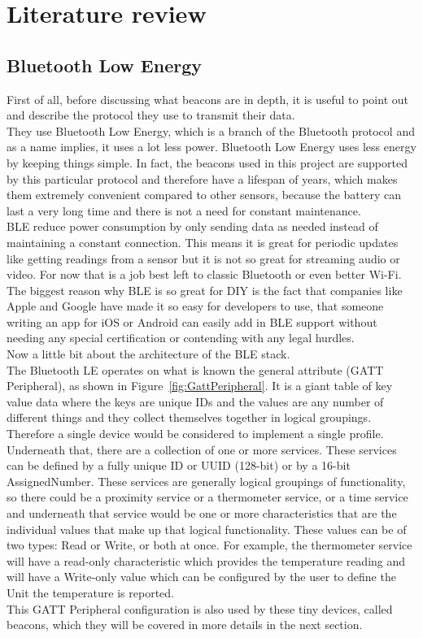 \chapter{Literature review}
\section{Bluetooth Low Energy}
First of all, before discussing what beacons are in depth, it is useful to point out and describe the protocol they use to transmit their data.\\
They use Bluetooth Low Energy, which is a branch of the Bluetooth protocol and as a name implies, it uses a lot less power. Bluetooth Low Energy uses less energy by keeping things simple. In fact, the beacons used in this project are supported by this particular protocol and therefore have a lifespan of years, which makes them extremely convenient compared to other sensors, because the battery can last a very long time and there is not a need for constant maintenance.\\
BLE reduce power consumption by only sending data as needed instead of maintaining a constant connection.
This means it is great for periodic updates like getting readings from a sensor but it is not so great for streaming audio or video. For now that is a job best left to classic Bluetooth or even better Wi-Fi.\\
The biggest reason why BLE is so great for DIY is the fact that companies like Apple and Google have made it so easy for developers to use, that someone writing an app for iOS or Android can easily add in BLE support without needing any special certification or contending with any legal hurdles.\\ 
Now a little bit about the architecture of the BLE stack.\\
The Bluetooth LE operates on what is known the general attribute (GATT Peripheral), as shown in Figure~\ref{fig:GattPeripheral}. It is a giant table of key value data where the keys are unique IDs and the values are any number of different things and they collect themselves together in logical groupings. Therefore a single device would be considered to implement a single profile.\\
Underneath that, there are a collection of one or more services. These services can be defined by a fully unique ID or UUID (128-bit) or by a 16-bit AssignedNumber. 
These services are generally logical groupings of functionality, so there could be a proximity service or a thermometer service, or a time service and underneath that service would be one or more characteristics that are the individual values that make up that logical functionality. These values can be of two types: Read or Write, or both at once. For example, the thermometer service will have a read-only characteristic which provides the temperature reading and will have a Write-only value which can be configured by the user to define the Unit the temperature is reported.\\
This GATT Peripheral configuration is also used by these tiny devices, called beacons, which they will be covered in more details in the next section.

